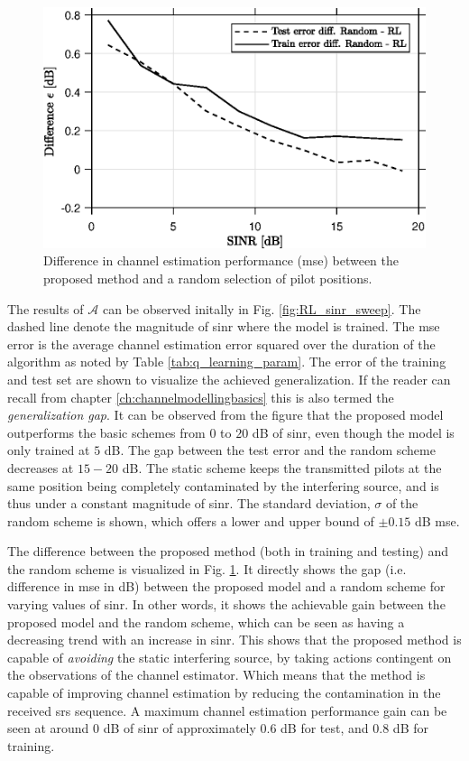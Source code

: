 \begin{figure}
    \centering
    \includegraphics{chapters/part_uplink/figures/results/SINR_sweep_diff.eps}
    \caption{Difference in channel estimation performance (\gls{mse}) between the proposed method and a random selection of pilot positions.}
    \label{fig:RL_SINR_sweep_diff}
\end{figure}
The results of $\mathcal{A}$ can be observed initally in Fig. \ref{fig:RL_sinr_sweep}. The dashed line denote the magnitude of \gls{sinr} where the model is trained. The \gls{mse} error is the average channel estimation error squared over the duration of the algorithm as noted by Table \ref{tab:q_learning_param}.  The error of the training and test set are shown to visualize the achieved generalization. If the reader can recall from chapter \ref{ch:channelmodellingbasics} this is also termed the \emph{generalization gap}. It can be observed from the figure that the proposed model outperforms the basic schemes from $0$ to $20$ dB of \gls{sinr}, even though the model is only trained at $5$ dB. The gap between the test error and the random scheme decreases at $15-20$ dB. The static scheme keeps the transmitted pilots at the same position being completely contaminated by the interfering source, and is thus under a constant magnitude of \gls{sinr}. The standard deviation, $\sigma$ of the random scheme is shown, which offers a lower and upper bound of $\pm 0.15$ dB \gls{mse}.


The difference between the proposed method (both in training and testing) and the random scheme is visualized in Fig. \ref{fig:RL_SINR_sweep_diff}. It directly shows the gap (i.e. difference in \gls{mse} in dB) between the proposed model and a random scheme for varying values of \gls{sinr}. In other words, it shows the achievable gain between the proposed model and the random scheme, which can be seen as having a decreasing trend with an increase in \gls{sinr}. This shows that the proposed method is capable of \emph{avoiding} the static interfering source, by taking actions contingent on the observations of the channel estimator. Which means that the method is capable of improving channel estimation by reducing the contamination in the received \gls{srs} sequence. A maximum channel estimation performance gain can be seen at around $0$ dB of \gls{sinr} of approximately $0.6$ dB for test, and $0.8$ dB for training. 



